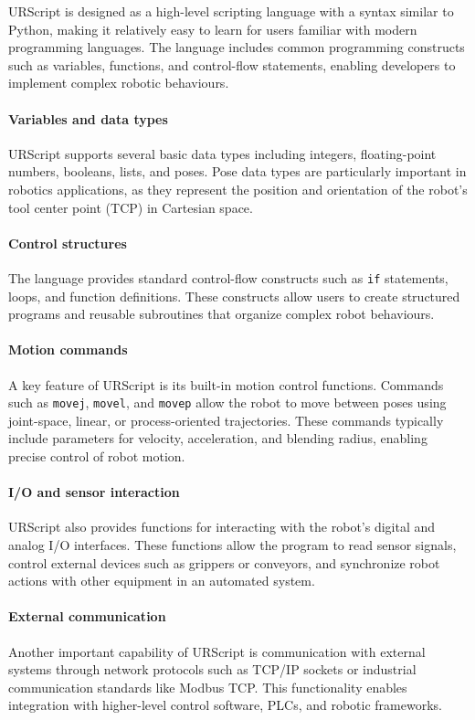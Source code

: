\documentclass[12pt]{extarticle}
\begin{document}
URScript is designed as a high-level scripting language with a syntax similar to Python, making it relatively easy to learn for users familiar with modern programming languages. The language includes common programming constructs such as variables, functions, and control-flow statements, enabling developers to implement complex robotic behaviours.

\paragraph{Variables and data types}
URScript supports several basic data types including integers, floating-point numbers, booleans, lists, and poses. Pose data types are particularly important in robotics applications, as they represent the position and orientation of the robot's tool center point (TCP) in Cartesian space.

\paragraph{Control structures}
The language provides standard control-flow constructs such as \texttt{if} statements, loops, and function definitions. These constructs allow users to create structured programs and reusable subroutines that organize complex robot behaviours.

\paragraph{Motion commands}
A key feature of URScript is its built-in motion control functions. Commands such as \texttt{movej}, \texttt{movel}, and \texttt{movep} allow the robot to move between poses using joint-space, linear, or process-oriented trajectories. These commands typically include parameters for velocity, acceleration, and blending radius, enabling precise control of robot motion.

\paragraph{I/O and sensor interaction}
URScript also provides functions for interacting with the robot's digital and analog I/O interfaces. These functions allow the program to read sensor signals, control external devices such as grippers or conveyors, and synchronize robot actions with other equipment in an automated system.

\paragraph{External communication}
Another important capability of URScript is communication with external systems through network protocols such as TCP/IP sockets or industrial communication standards like Modbus TCP. This functionality enables integration with higher-level control software, PLCs, and robotic frameworks.
\end{document}
